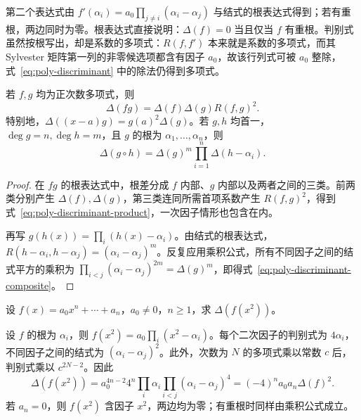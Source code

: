 第二个表达式由 $f'(\alpha_i)=a_0\prod_{j\ne i}(\alpha_i-\alpha_j)$ 与结式的根表达式得到；若有重根，两边同时为零。根表达式直接说明：$\Delta(f)=0$ 当且仅当 $f$ 有重根。判别式虽然按根写出，却是系数的多项式：$R(f,f')$ 本来就是系数的多项式，而其 Sylvester 矩阵第一列的非零候选项都含有因子 $a_0$，故该行列式可被 $a_0$ 整除，式~\eqref{eq:poly-discriminant} 中的除法仍得到多项式。

\begin{proposition}
\label{prop:poly-discriminant-products}
若 $f,g$ 均为正次数多项式，则
\begin{equation}
\label{eq:poly-discriminant-product}
    \Delta(fg)=\Delta(f)\Delta(g)R(f,g)^2.
\end{equation}
特别地，$\Delta((x-a)g)=g(a)^2\Delta(g)$。若 $g,h$ 均首一，$\deg g=n,\deg h=m$，且 $g$ 的根为 $\alpha_1,\ldots,\alpha_n$，则
\begin{equation}
\label{eq:poly-discriminant-composite}
    \Delta(g\circ h)=\Delta(g)^m\prod_{i=1}^n\Delta(h-\alpha_i).
\end{equation}
\end{proposition}
\begin{proof}
在 $fg$ 的根表达式中，根差分成 $f$ 内部、$g$ 内部以及两者之间的三类。前两类分别产生 $\Delta(f),\Delta(g)$，第三类连同所需首项系数产生 $R(f,g)^2$，得到式~\eqref{eq:poly-discriminant-product}，一次因子情形也包含在内。

再写 $g(h(x))=\prod_i(h(x)-\alpha_i)$。由结式的根表达式，$R(h-\alpha_i,h-\alpha_j)=(\alpha_i-\alpha_j)^m$。反复应用乘积公式，所有不同因子之间的结式平方的乘积为 $\prod_{i<j}(\alpha_i-\alpha_j)^{2m}=\Delta(g)^m$，即得式~\eqref{eq:poly-discriminant-composite}。
\end{proof}

\begin{example}
\label{ex:poly-discriminant-substitution}
设 $f(x)=a_0x^n+\cdots+a_n$，$a_0\ne0$，$n\geq1$，求 $\Delta(f(x^2))$。
\end{example}
\begin{solve}
设 $f$ 的根为 $\alpha_i$，则 $f(x^2)=a_0\prod_i(x^2-\alpha_i)$。每个二次因子的判别式为 $4\alpha_i$，不同因子之间的结式为 $(\alpha_i-\alpha_j)^2$。此外，次数为 $N$ 的多项式乘以常数 $c$ 后，判别式乘以 $c^{2N-2}$。因此
\[
    \Delta(f(x^2))=a_0^{4n-2}4^n\prod_i\alpha_i
    \prod_{i<j}(\alpha_i-\alpha_j)^4
    =(-4)^na_0a_n\Delta(f)^2.
\]
若 $a_n=0$，则 $f(x^2)$ 含因子 $x^2$，两边均为零；有重根时同样由乘积公式成立。
\end{solve}

